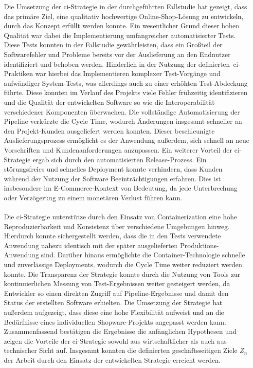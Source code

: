 Die Umsetzung der \acrshort{ci}-Strategie in der durchgeführten Fallstudie hat gezeigt, dass das
primäre Ziel, eine qualitativ hochwertige Online-Shop-Lösung zu entwickeln, durch das Konzept erfüllt werden konnte.
Ein wesentlicher Grund dieser hohen Qualität war dabei die Implementierung umfangreicher automatisierter Tests.
Diese Tests konnten in der Fallstudie gewährleisten, dass ein Großteil der Softwarefehler und Probleme bereits vor der
Auslieferung an den Endnutzer identifiziert und behoben werden.
Hinderlich in der Nutzung der definierten\ \acrshort{ci}-Praktiken war hierbei das Implementieren komplexer
Test-Vorgänge und aufwändiger System-Tests, was allerdings auch zu einer erhöhten Test-Abdeckung führte.
Diese konnten im Verlauf des Projekts viele Fehler frühzeitig identifizieren und die Qualität der
entwickelten Software so wie die Interoperabilität verschiedener Komponenten überwachen.
Die vollständige Automatisierung der Pipeline verkürzte die Cycle Time, wodurch Änderungen insgesamt schneller an
den Projekt-Kunden ausgeliefert werden konnten.
Dieser beschleunigte Auslieferungsprozess ermöglicht es der Anwendung außerdem, sich schnell an neue Vorschriften und
Kundenanforderungen anzupassen.
Ein weiterer Vorteil der \acrshort{ci}-Strategie ergab sich durch den automatisierten Release-Prozess.
Ein störungsfreies und schnelles Deployment konnte verhindern, dass Kunden während der Nutzung der Software
Beeinträchtigungen erfahren.
Dies ist insbesondere im E-Commerce-Kontext von Bedeutung, da jede Unterbrechung oder Verzögerung zu einem monetären
Verlust führen kann.
\\\\
Die \acrshort{ci}-Strategie unterstütze durch den Einsatz von Containerization eine hohe Reproduzierbarkeit und
Konsistenz über verschiedene Umgebungen hinweg.
Hierdurch konnte sichergestellt werden, dass die in den Tests verwendete Anwendung nahezu identisch mit der später
ausgelieferten Produktions-Anwendung sind.
Darüber hinaus ermöglichte die Container-Technologie schnelle und zuverlässige Deployments, wodurch die
Cycle Time weiter reduziert werden konnte.
Die Transparenz der Strategie konnte durch die Nutzung von Tools zur kontinuierlichen Messung von Test-Ergebnissen
weiter gesteigert werden, da Entwickler so einen direkten Zugriff auf Pipeline-Ergebnisse und damit den Status der
erstellten Software erhielten.
Die Umsetzung der Strategie hat außerdem aufgezeigt, dass diese eine hohe Flexibilität aufweist und an die Bedürfnisse
eines individuellen Shopware-Projekts angepasst werden kann.
Zusammenfassend bestätigen die Ergebnisse die anfänglichen Hypothesen und zeigen die Vorteile der
\acrshort{ci}-Strategie sowohl aus wirtschaftlicher als auch aus technischer Sicht auf.
Insgesamt konnten die definierten geschäftsseitigen Ziele $Z_n$ der Arbeit durch den Einsatz der entwickelten Strategie
erreicht werden.

\clearpage
